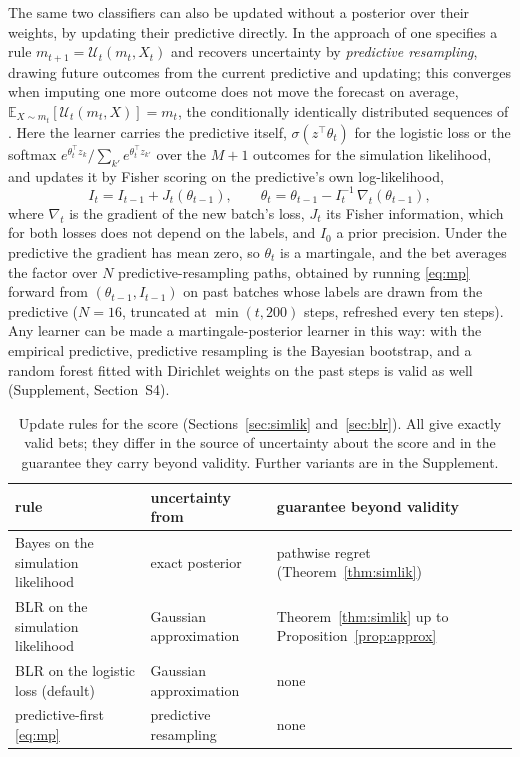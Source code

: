 \documentclass[12pt]{article}
\newcommand{\E}{\mathbb{E}}
\theoremstyle{remark}
\begin{document}
The same two classifiers can also be updated without a posterior over their
weights, by updating their predictive directly. In the approach of
\citet{fong2023martingale} one specifies a rule
$m_{t+1} = \mathcal U_t(m_t, X_t)$ and recovers uncertainty by
\emph{predictive resampling}, drawing future outcomes from the current
predictive and updating; this converges when imputing one more outcome does
not move the forecast on average, $\E_{X \sim m_t}[\mathcal U_t(m_t, X)] = m_t$,
the conditionally identically distributed sequences of \citet{berti2004limit}.
Here the learner carries the predictive itself, $\sigma(z^\top\theta_t)$ for
the logistic loss or the softmax $e^{\theta_t^\top z_k}/\sum_{k'} e^{\theta_t^\top z_{k'}}$
over the $M+1$ outcomes for the simulation likelihood, and updates it by
Fisher scoring on the predictive's own log-likelihood,
\begin{equation}\label{eq:mp}
I_t = I_{t-1} + J_t(\theta_{t-1}), \qquad
\theta_t = \theta_{t-1} - I_t^{-1}\, \nabla_t(\theta_{t-1}),
\end{equation}
where $\nabla_t$ is the gradient of the new batch's loss, $J_t$ its Fisher
information, which for both losses does not depend on the labels, and $I_0$ a
prior precision. Under the predictive the gradient has mean zero, so
$\theta_t$ is a martingale, and the bet averages the factor over $N$
predictive-resampling paths, obtained by running \eqref{eq:mp} forward from
$(\theta_{t-1}, I_{t-1})$ on past batches whose labels are drawn from the
predictive ($N = 16$, truncated at $\min(t, 200)$ steps, refreshed every ten
steps). Any learner can be made a martingale-posterior learner in this way:
with the empirical predictive, predictive resampling is the Bayesian
bootstrap, and a random forest fitted with Dirichlet weights on the past steps
is valid as well (Supplement, Section~S4).

\begin{table}[t]
\centering
\caption{Update rules for the score (Sections~\ref{sec:simlik}
and~\ref{sec:blr}). All give exactly valid bets; they differ in the source of
uncertainty about the score and in the guarantee they carry beyond validity.
Further variants are in the Supplement.}
\label{tab:rules}
\small
\begin{tabular}{lll}
\toprule
rule & uncertainty from & guarantee beyond validity \\
\midrule
Bayes on the simulation likelihood & exact posterior & pathwise regret (Theorem~\ref{thm:simlik}) \\
BLR on the simulation likelihood & Gaussian approximation & Theorem~\ref{thm:simlik} up to Proposition~\ref{prop:approx} \\
BLR on the logistic loss (default) & Gaussian approximation & none \\
predictive-first \eqref{eq:mp} & predictive resampling & none \\
\bottomrule
\end{tabular}
\end{table}
\end{document}
